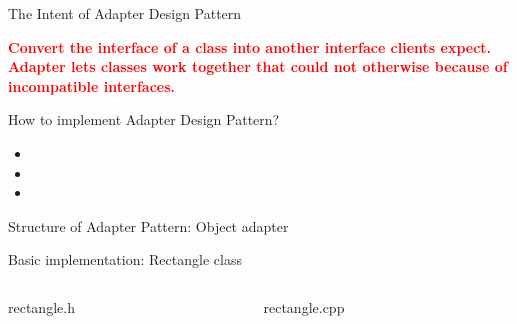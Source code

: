 \documentclass[13pt]{beamer}
\begin{document}
\begin{frame}{The Intent of Adapter Design Pattern}
	\begin{center}
	\textcolor{red}{\textbf{Convert the interface of a class into another interface clients expect. Adapter lets classes work together that could not otherwise because of incompatible interfaces.}}\\
	\end{center}
\end{frame}

\begin{frame}{How to implement Adapter Design Pattern?}
	\begin{itemize}
		\setlength\itemsep{2em}
		\item 
		\item 
		\item 
	\end{itemize}
\end{frame}

\begin{frame}{Structure of Adapter Pattern: Object adapter}
	\begin{center}
	\end{center}
\end{frame}

\begin{frame}{Basic implementation: Rectangle class}
\begin{columns}[T]
\begin{column}{.45\textwidth}
\lstset{basicstyle=\tiny,style=myCustomCppStyle}
rectangle.h

\end{column}

\begin{column}{.45\textwidth}
\lstset{basicstyle=\tiny,style=myCustomCppStyle}
rectangle.cpp

\end{column}
\end{columns}
\end{frame}
\end{document}
